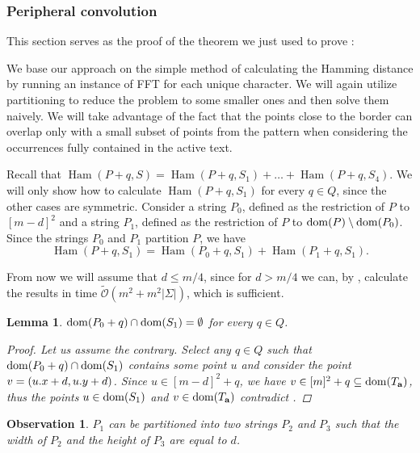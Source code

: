 \documentclass[11pt, letterpaper]{article}
\theoremstyle{plain}
\newtheorem{lemma}{Lemma}
\newtheorem{observation}{Observation}
\theoremstyle{definition}
\theoremstyle{remark}
\newcommand{\tO}{\tilde{\mathcal{O}}}
\DeclareMathOperator*{\Ham}{Ham}
\begin{document}
\subsubsection{Peripheral convolution} \label{sigma_border_proof}

This section serves as the proof of the theorem we just used to prove :

\SigmaBorder

We base our approach on the simple method of calculating the Hamming distance by running an instance of FFT for each unique character.
We will again utilize partitioning to reduce the problem to some smaller ones and then solve them naively.
We will take advantage of the fact that the points close to the border can overlap only with a small subset of points from the pattern when considering the occurrences fully contained in the active text.

Recall that 
$\Ham(P + q, S) = \Ham(P + q, S_1) + \dots + \Ham(P + q, S_4)$.
We will only show how to calculate $\Ham(P + q, S_1)$ for every $q \in Q$, since the other cases are symmetric.
Consider a string $P_0$, defined as the restriction of $P$ to $[m - d]^2$ and a string $P_1$, defined as the restriction of $P$ to $\operatorname*{dom}(P) \setminus \operatorname*{dom}(P_0)$.
Since the strings $P_0$ and $P_1$ partition $P$, we have
\[ \Ham(P + q, S_1) = \Ham(P_0 + q, S_1) + \Ham(P_1 + q, S_1).\]


From now we will assume that $d \le m / 4$, since for $d > m / 4$ we can, by , calculate the results in time $\tO(m^2 + m^2|\Sigma|)$, which is sufficient.


\begin{lemma}\label{border_hamming_reduction}
	$\operatorname*{dom}(P_0 + q) \cap \operatorname*{dom}(S_1) = \emptyset$ for every $q \in Q$.
	\begin{proof}
		Let us assume the contrary.
		Select any $q \in Q$ such that $\operatorname*{dom}(P_0 + q) \cap \operatorname*{dom}(S_1)$ 
		contains some point $u$ and consider the point $v = (u.x + d, u.y + d)$.
		Since $u \in [m - d]^2 + q$, we have $v \in [m]^2 + q \subseteq \operatorname*{dom}(T_\mathbf{a})$, thus the points $u \in \operatorname*{dom}(S_1)$ and $v \in \operatorname*{dom}(T_\mathbf{a})$ contradict .
	\end{proof}
\end{lemma}

\begin{observation}\label{border_hamming_split}
	$P_1$ can be partitioned into two strings $P_2$ and $P_3$ such that the width of $P_2$ and the height of $P_3$ are equal to $d$.
\end{observation}
\end{document}

